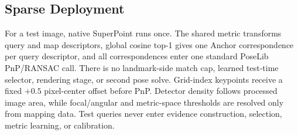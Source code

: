 \subsection{Sparse Deployment}

For a test image, native SuperPoint runs once. The shared metric transforms
query and map descriptors, global cosine top-1 gives one Anchor correspondence
per query descriptor, and all correspondences enter one standard PoseLib
PnP/RANSAC call. There is no landmark-side match cap, learned test-time
selector, rendering stage, or second pose solve. Grid-index keypoints receive a
fixed $+0.5$ pixel-center offset before PnP. Detector density follows processed
image area, while focal/angular and metric-space thresholds are resolved only
from mapping data. Test queries never enter evidence construction, selection,
metric learning, or calibration.
